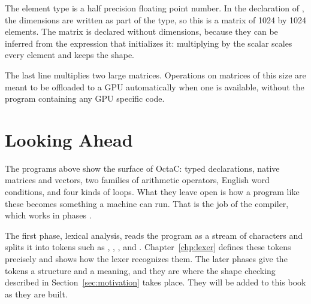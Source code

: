 The element type  is a half precision floating point number. In the
declaration of , the dimensions are written as part of the type, so
this is a matrix of 1024 by 1024 elements. The matrix  is declared
without dimensions, because they can be inferred from the expression that
initializes it: multiplying  by the scalar  scales every
element and keeps the shape.

The last line multiplies two large matrices. Operations on matrices of this
size are meant to be offloaded to a GPU automatically when one is available,
without the program containing any GPU specific code.

\section{Looking Ahead}

The programs above show the surface of OctaC: typed declarations, native
matrices and vectors, two families of arithmetic operators, English word
conditions, and four kinds of loops. What they leave open is how a program
like these becomes something a machine can run. That is the job of the
compiler, which works in phases \cite{aho2006compilers}.

The first phase, lexical analysis, reads the program as a stream of
characters and splits it into tokens such as , , ,
and . Chapter~\ref{chp:lexer} defines these tokens precisely and
shows how the lexer recognizes them. The later phases give the tokens a
structure and a meaning, and they are where the shape checking described in
Section~\ref{sec:motivation} takes place. They will be added to this book as
they are built.
